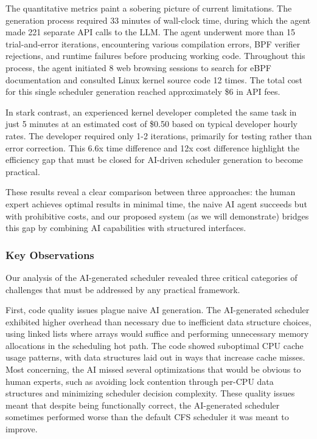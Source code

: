The quantitative metrics paint a sobering picture of current limitations. The generation process required 33 minutes of wall-clock time, during which the agent made 221 separate API calls to the LLM. The agent underwent more than 15 trial-and-error iterations, encountering various compilation errors, BPF verifier rejections, and runtime failures before producing working code. Throughout this process, the agent initiated 8 web browsing sessions to search for eBPF documentation and consulted Linux kernel source code 12 times. The total cost for this single scheduler generation reached approximately \$6 in API fees.

In stark contrast, an experienced kernel developer completed the same task in just 5 minutes at an estimated cost of \$0.50 based on typical developer hourly rates. The developer required only 1-2 iterations, primarily for testing rather than error correction. This 6.6x time difference and 12x cost difference highlight the efficiency gap that must be closed for AI-driven scheduler generation to become practical.

These results reveal a clear comparison between three approaches: the human expert achieves optimal results in minimal time, the naive AI agent succeeds but with prohibitive costs, and our proposed system (as we will demonstrate) bridges this gap by combining AI capabilities with structured interfaces.

\subsubsection{Key Observations}

Our analysis of the AI-generated scheduler revealed three critical categories of challenges that must be addressed by any practical framework.

First, code quality issues plague naive AI generation. The AI-generated scheduler exhibited higher overhead than necessary due to inefficient data structure choices, using linked lists where arrays would suffice and performing unnecessary memory allocations in the scheduling hot path. The code showed suboptimal CPU cache usage patterns, with data structures laid out in ways that increase cache misses. Most concerning, the AI missed several optimizations that would be obvious to human experts, such as avoiding lock contention through per-CPU data structures and minimizing scheduler decision complexity. These quality issues meant that despite being functionally correct, the AI-generated scheduler sometimes performed worse than the default CFS scheduler it was meant to improve.

